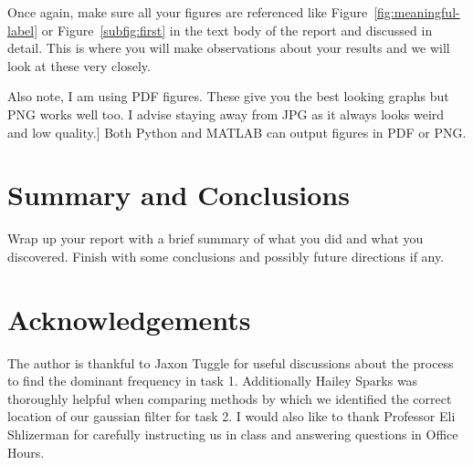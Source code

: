 \documentclass[11pt]{amsart}
\begin{document}
Once again, make sure all your figures are referenced like Figure~\ref{fig:meaningful-label}
or Figure~\ref{subfig:first} in the text body of the report and discussed 
in detail. This is where you will make observations about your results and we will 
look at these very closely. 

Also note, I am using PDF figures. These give you the best looking graphs but PNG works 
well too. I advise staying away from JPG as it always looks weird and low quality.]
Both Python and MATLAB can output figures in PDF or PNG.

\section{Summary and Conclusions}\label{sec:conclusions}
Wrap up your report with a brief summary of what you did and what you discovered. 
Finish with some conclusions and possibly future directions if any. 

\section*{Acknowledgements} 

The author is thankful to Jaxon Tuggle for useful discussions about the process to find the dominant frequency in task 1. 
Additionally Hailey Sparks was thoroughly helpful when comparing methods by which we identified the correct location of our gaussian filter for task 2. I would also like to thank Professor Eli Shlizerman for carefully instructing us in class and answering questions in Office Hours.


\end{document}
